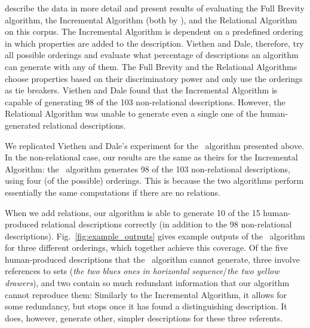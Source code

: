  describe the data in
more detail and present results of evaluating the Full Brevity
algorithm, the Incremental Algorithm (both by ), and
the Relational Algorithm \cite{dale91:_gener_refer_expres_invol_relat}
on this corpus. The Incremental Algorithm is dependent on a predefined
ordering in which properties are added to the description. Viethen and
Dale, therefore, try all possible orderings and evaluate what
percentage of descriptions an algorithm can generate with any of
them. The Full Brevity and the Relational Algorithms choose properties
based on their discriminatory power and only use the orderings as tie
breakers. Viethen and Dale found that the Incremental Algorithm is
capable of generating 98 of the 103 non-relational
descriptions. However, the Relational Algorithm was unable to
generate even a single one of the human-generated relational
descriptions.




We replicated Viethen and Dale's experiment for the \el\ algorithm
presented above. In the non-relational case, our results are the same
as theirs for the Incremental Algorithm: the \el\ algorithm generates
98 of the 103 non-relational descriptions, using four (of the
possible) orderings.  This is because the two algorithms perform
essentially the same computations if there are no relations.



When we add relations, our algorithm is able to generate 10 of the 15
human-produced relational descriptions correctly (in addition to the
98 non-relational descriptions).  Fig.~\ref{fig:example_outputs} gives
example outputs of the \el\ algorithm for three different orderings,
which together achieve this coverage.  Of the five human-produced
descriptions that the \el\ algorithm cannot generate, three involve
references to sets (\textit{the two blues ones in horizontal
  sequence}/\textit{the two yellow drawers}), and two contain so much
redundant information that our algorithm cannot reproduce them:
Similarly to the Incremental Algorithm, it allows for some redundancy,
but stops once it has found a distinguishing description. It does,
however, generate other, simpler descriptions for these three
referents. 

